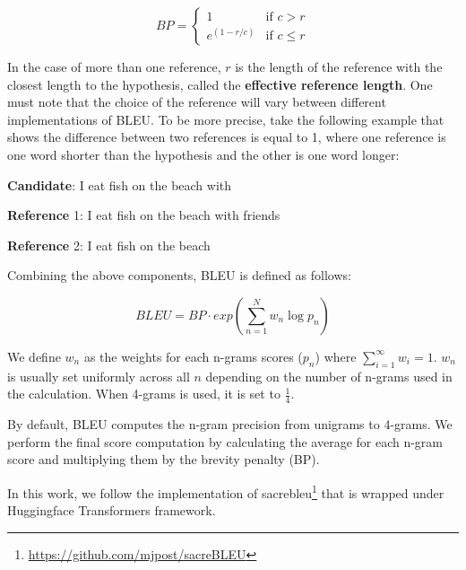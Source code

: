 \begin{equation}
    BP=\begin{cases} 1 & \mbox{if } c>r \\ e^{(1-r/c)} & \mbox{if } c\le r \end{cases}
\end{equation}

In the case of more than one reference, $r$ is the length of the reference with the closest length to the hypothesis, called the \textbf{effective reference length}. One must note that the choice of the reference will vary between different implementations of BLEU. To be more precise, take the following example that shows the difference between two references is equal to 1, where one reference is one word shorter than the hypothesis and the other is one word longer:

\bigskip

\textbf{Candidate}: I eat fish on the beach with

\textbf{Reference} 1: I eat fish on the beach with friends

\textbf{Reference} 2: I eat fish on the beach

\bigskip

Combining the above components, BLEU is defined as follows:

\begin{equation}
    BLEU=BP\cdot exp\left( \sum_{n=1}^{N} w_n \log p_n \right)
\end{equation}

We define $w_n$ as the weights for each n-grams scores ($p_n$) where $\sum^{\infty}_{i=1} w_i = 1$. $w_n$ is usually set uniformly across all $n$ depending on the number of n-grams used in the calculation. When 4-grams is used, it is set to $\frac{1}{4}$.

By default, BLEU computes the n-gram precision from unigrams to 4-grams. We perform the final score computation by calculating the average for each n-gram score and multiplying them by the brevity penalty (BP).

In this work, we follow the implementation of sacrebleu\footnote{\url{https://github.com/mjpost/sacreBLEU}}  that is wrapped under Huggingface Transformers framework.